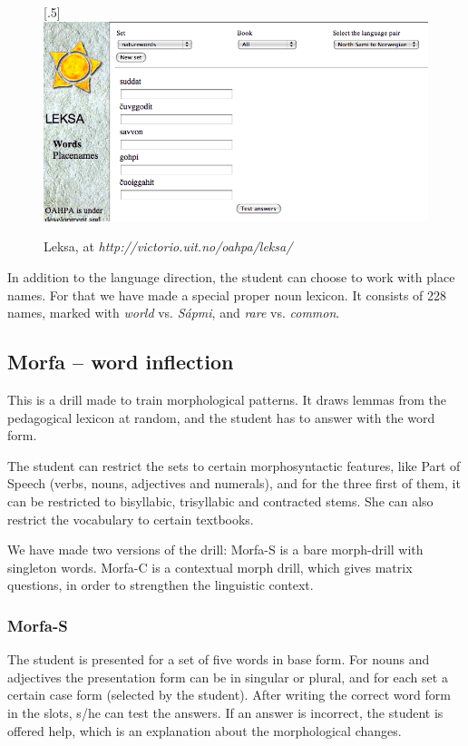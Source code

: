 \documentclass[a4paper,12pt]{article}
\begin{document}
\begin{figure}[htbp]
\begin{center}
\scalebox{.5}[.5]{\includegraphics{presentation/img/leksa.png}}\\
\caption{Leksa, at \textit{http://victorio.uit.no/oahpa/leksa/}}
\label{leksa}
\end{center}
\end{figure}

\vspace{0.5cm}
In addition to the language direction, the student can choose to work with place names. For that we have made a special proper noun lexicon. It consists of 228 names, marked with \textit{world} vs. \textit{Sápmi}, and \textit{rare} vs. \textit{common}. 


\subsection{Morfa -- word inflection}
This is a drill made to train morphological patterns. It draws lemmas from the pedagogical lexicon at random, and the student has to answer with the word form. 

The student can restrict the sets to certain morphosyntactic features, like Part of Speech (verbs, nouns, adjectives and numerals), and for the three first of them, it can be restricted to bisyllabic, trisyllabic and contracted stems. She can also restrict the vocabulary to certain textbooks.

We have made two versions of the drill: Morfa-S is a bare morph-drill with singleton words. Morfa-C is a contextual morph drill, which gives matrix questions, in order to strengthen the linguistic context.

\subsubsection{Morfa-S}
The student is presented for a set of five words in base form. For nouns and adjectives the presentation form can be in singular or plural, and for each set a certain case form (selected by the student). After writing the correct word form in the slots, s/he can test the answers. If an answer is incorrect, the student is offered help, which is an explanation about the morphological changes.
\end{document}
